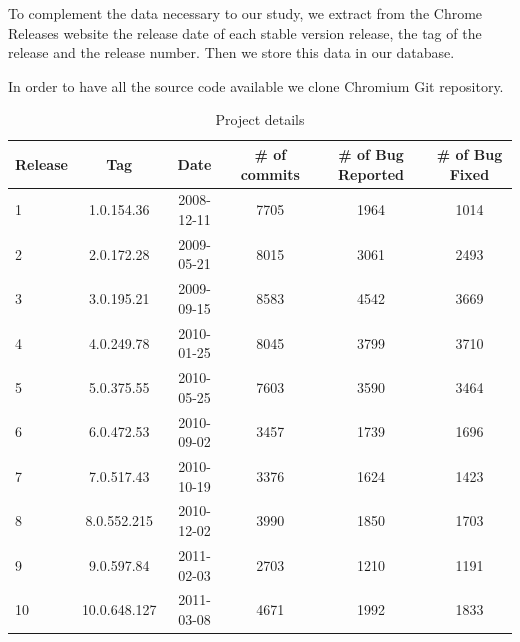 To complement the data necessary to our study, we extract from the Chrome Releases website \cite{chrome_releases} the release date of each stable version release, the tag of the release and the release number. Then we store this data in our database.
 
In order to have all the source code available we clone Chromium Git repository. 

\begin{table}[!hbt]
      \begin{center}
            \caption{Project details}
            \label{tab:project_details}
            \begin{tabular}{l| c c c c c}
            \toprule
            \textbf{Release}  & \textbf{Tag} & \textbf{Date} & \textbf{\# of commits} & \textbf{\# of Bug Reported} & \textbf{\# of Bug Fixed} \\ \midrule 
              1               & 1.0.154.36    & 2008-12-11   &    7705                &         1964                &      1014 \\
              2               & 2.0.172.28    & 2009-05-21   &    8015                &         3061                &      2493 \\
              3               & 3.0.195.21    & 2009-09-15   &    8583                &         4542                &      3669 \\
              4               & 4.0.249.78    & 2010-01-25   &    8045                &         3799                &      3710 \\
              5               & 5.0.375.55    & 2010-05-25   &    7603                &         3590                &      3464 \\
              6               & 6.0.472.53    & 2010-09-02   &    3457                &         1739                &      1696 \\
              7               & 7.0.517.43    & 2010-10-19   &    3376                &         1624                &      1423 \\
              8               & 8.0.552.215   & 2010-12-02   &    3990                &         1850                &      1703 \\
              9               & 9.0.597.84    & 2011-02-03   &    2703                &         1210                &      1191 \\
             10               & 10.0.648.127  & 2011-03-08   &    4671                &         1992                &      1833 \\

\end{tabular}
\end{center}
\end{table}
